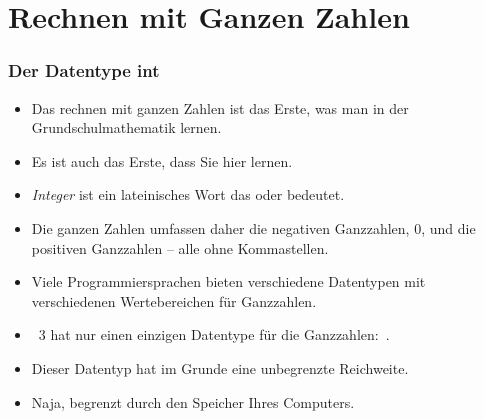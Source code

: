 \documentclass[aspectratio=169,mathserif,notheorems]{beamer}%
\begin{document}
\section{Rechnen mit Ganzen Zahlen}%
%
\begin{frame}%
\frametitle{Der Datentype int}%
\begin{itemize}%
\item Das rechnen mit ganzen Zahlen ist das Erste, was man in der Grundschulmathematik lernen.%
\item<2-> Es ist auch das Erste, dass Sie hier lernen.%
\item<3-> \emph{Integer} ist ein lateinisches Wort das  oder  bedeutet.%
\item<4-> Die ganzen Zahlen umfassen daher die negativen Ganzzahlen, 0, und die positiven Ganzzahlen -- alle ohne Kommastellen. %
\item<5-> Viele Programmiersprachen bieten verschiedene Datentypen mit verschiedenen Wertebereichen für Ganzzahlen.%
\item<8-> \python~3 hat nur einen einzigen Datentype für die Ganzzahlen:~.%
\item<9-> Dieser Datentyp hat im Grunde eine unbegrenzte Reichweite.%
\item<10-> Naja, begrenzt durch den Speicher Ihres Computers.%
\end{itemize}%
\end{frame}%
%
\end{document}

